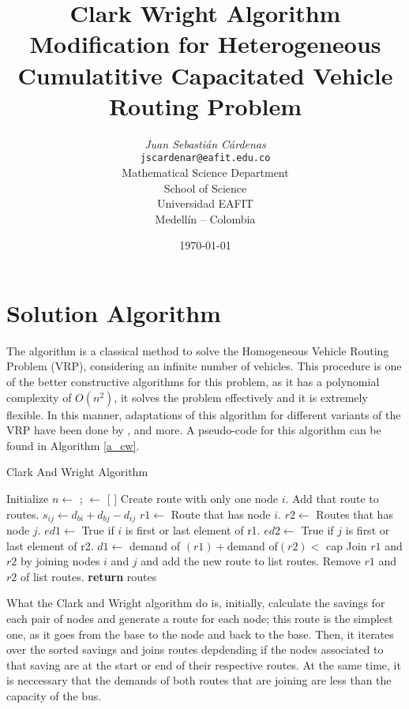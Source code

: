 \documentclass[10pt,twoside]{article}
\title{Clark Wright Algorithm Modification for Heterogeneous Cumulatitive Capacitated Vehicle Routing Problem}
\author{\emph{Juan Sebastián Cárdenas}\\
\vspace{0.3cm}
\small{\tt{jscardenar@eafit.edu.co}}\\
Mathematical Science Department\\
School of Science\\
Universidad EAFIT\\
Medellín -- Colombia}
\date{\today}
\begin{document}
\maketitle

\thispagestyle{firststyle}

\section{Solution Algorithm}\label{sec_alg}
The \cite{clarke1964} algorithm is a classical method to solve the
Homogeneous Vehicle Routing Problem (VRP), considering an infinite
number of vehicles. This procedure is one of the
better constructive algorithms for this problem, as it has a
polynomial complexity of $O(n^2)$, it solves the problem
effectively and it is extremely flexible. In this manner, adaptations
of this algorithm for different variants of the VRP have been done by
\cite{golden1984}, \cite{caccetta2013} and more. A pseudo-code for this algorithm can be found in Algorithm \ref{a_cw}.

\begin{algorithm}[H]
\caption{Clark And Wright Algorithm}\label{a_cw}
\begin{algorithmic}[1]
  \State Initialize $n \gets $ ;  $\gets$ [ ]
    \State Create route with only one node $i$. Add that route to routes.
     
       \State $s_{ij} \gets d_{bi} + d_{bj} - d_{ij}$ 
    \EndFor
   \EndFor
   \State {}
      \State $r1 \gets$ Route that has node $i$.
      \State $r2 \gets$ Routes that has node $j$.
      \State $ed1 \gets$ True if $i$ is first or last element of r1.
      \State $ed2 \gets$ True if $j$ is first or last element of r2.
      \State $d1 \gets$ demand of $(r1) + $demand of$(r2) < $ cap
        \State Join $r1$ and $r2$ by joining nodes $i$ and $j$ and add the new route to list routes.
        \State Remove $r1$ and $r2$ of list routes.
      \EndIf
   \EndFor
   \State \textbf{return} routes
\EndProcedure
\end{algorithmic}
\end{algorithm}

What the Clark and Wright algorithm do is, initially, calculate the
savings for each pair of nodes and generate a route for each node;
this route is the simplest one, as it goes from the base to the node
and back to the base. Then, it iterates over the sorted savings and
joins routes depdending if the nodes associated to that saving are at
the start or end of their respective routes. At the same time, it is
neccessary that the demands of both routes that are joining are less
than the capacity of the bus.
\end{document}
